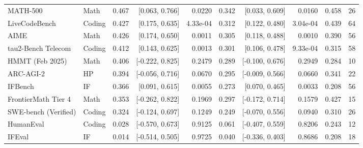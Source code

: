 \begin{tabular}{llrrrrrrrr}
MATH-500 & Math & 0.467 & [0.063, 0.766] & 0.0220 & 0.342 & [0.033, 0.609] & 0.0160 & 0.458 & 26 \\
LiveCodeBench & Coding & 0.427 & [0.175, 0.635] & 4.33e-04 & 0.312 & [0.122, 0.480] & 3.04e-04 & 0.439 & 64 \\
AIME & Math & 0.426 & [0.174, 0.650] & 0.0011 & 0.305 & [0.118, 0.488] & 0.0010 & 0.390 & 56 \\
tau2-Bench Telecom & Coding & 0.412 & [0.143, 0.625] & 0.0013 & 0.301 & [0.106, 0.478] & 9.33e-04 & 0.315 & 58 \\
HMMT (Feb 2025) & Math & 0.406 & [-0.222, 0.825] & 0.2479 & 0.289 & [-0.100, 0.676] & 0.2949 & 0.284 & 10 \\
ARC-AGI-2 & HP & 0.394 & [-0.056, 0.716] & 0.0670 & 0.295 & [-0.009, 0.566] & 0.0660 & 0.341 & 22 \\
IFBench & IF & 0.366 & [0.091, 0.615] & 0.0055 & 0.273 & [0.070, 0.465] & 0.0033 & 0.208 & 56 \\
FrontierMath Tier 4 & Math & 0.353 & [-0.262, 0.822] & 0.1969 & 0.297 & [-0.172, 0.714] & 0.1579 & 0.427 & 15 \\
SWE-bench (Verified) & Coding & 0.324 & [-0.124, 0.697] & 0.1249 & 0.249 & [-0.070, 0.556] & 0.0940 & 0.310 & 26 \\
HumanEval & Coding & 0.028 & [-0.570, 0.673] & 0.9125 & 0.061 & [-0.407, 0.559] & 0.8206 & 0.243 & 12 \\
IFEval & IF & 0.014 & [-0.514, 0.505] & 0.9725 & 0.040 & [-0.336, 0.403] & 0.8686 & 0.208 & 18 \\
\bottomrule
\end{tabular}
